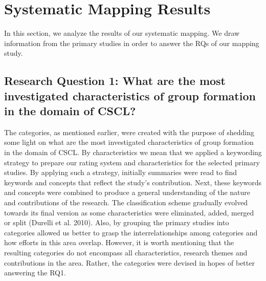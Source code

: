 \section{Systematic Mapping Results}

In this section, we analyze the results of our systematic mapping. We draw information from the primary studies in order to answer the RQs of our mapping study. 

\subsection{Research Question 1: What are the most investigated characteristics of group formation in the domain of CSCL?}

The categories, as mentioned earlier, were created with the purpose of shedding some light on what are the most investigated characteristics of group formation in the domain of CSCL. By characteristics we mean that we applied a keywording strategy to prepare our rating system and characteristics for the selected primary studies. By applying such a strategy, initially summaries were read to find keywords and concepts that reflect the study's contribution. Next, these keywords and concepts were combined to produce a general understanding of the nature and contributions of the research. The classification scheme gradually evolved towards its final version as some characteristics were eliminated, added, merged or split (Durelli et al. 2010).
Also, by grouping the primary studies into categories allowed us better to grasp the interrelationships among categories and how efforts in this area overlap. However, it is worth mentioning that the resulting categories do not encompass all characteristics, research themes and contributions in the area. Rather, the categories were devised in hopes of better answering the RQ1.


